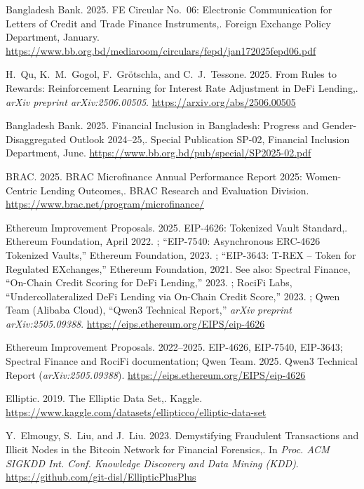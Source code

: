 {\begin{enumerate}[label={[\arabic*]}]
\item Bangladesh Bank. 2025. FE Circular No.~06: Electronic Communication for Letters of Credit and Trade Finance Instruments,. Foreign Exchange Policy Department, January. \url{https://www.bb.org.bd/mediaroom/circulars/fepd/jan172025fepd06.pdf}

\item H.~Qu, K.~M.~Gogol, F.~Gr\"{o}tschla, and C.~J.~Tessone. 2025. From Rules to Rewards: Reinforcement Learning for Interest Rate Adjustment in DeFi Lending,. \emph{arXiv preprint arXiv:2506.00505}. \url{https://arxiv.org/abs/2506.00505}

\item Bangladesh Bank. 2025. Financial Inclusion in Bangladesh: Progress and Gender-Disaggregated Outlook 2024--25,. Special Publication SP-02, Financial Inclusion Department, June. \url{https://www.bb.org.bd/pub/special/SP2025-02.pdf}

\item BRAC. 2025. BRAC Microfinance Annual Performance Report 2025: Women-Centric Lending Outcomes,. BRAC Research and Evaluation Division. \url{https://www.brac.net/program/microfinance/}

\item Ethereum Improvement Proposals. 2025. EIP-4626: Tokenized Vault Standard,. Ethereum Foundation, April 2022. ; ``EIP-7540: Asynchronous ERC-4626 Tokenized Vaults,'' Ethereum Foundation, 2023. ; ``EIP-3643: T-REX -- Token for Regulated EXchanges,'' Ethereum Foundation, 2021.  See also: Spectral Finance, ``On-Chain Credit Scoring for DeFi Lending,'' 2023. ; RociFi Labs, ``Undercollateralized DeFi Lending via On-Chain Credit Score,'' 2023. ; Qwen Team (Alibaba Cloud), ``Qwen3 Technical Report,'' \emph{arXiv preprint arXiv:2505.09388}. \url{https://eips.ethereum.org/EIPS/eip-4626}

\item Ethereum Improvement Proposals. 2022--2025. EIP-4626, EIP-7540, EIP-3643; Spectral Finance and RociFi documentation; Qwen Team. 2025. Qwen3 Technical Report (\emph{arXiv:2505.09388}). \url{https://eips.ethereum.org/EIPS/eip-4626}

\item Elliptic. 2019. The Elliptic Data Set,. Kaggle. \url{https://www.kaggle.com/datasets/ellipticco/elliptic-data-set}

\item Y.~Elmougy, S.~Liu, and J.~Liu. 2023. Demystifying Fraudulent Transactions and Illicit Nodes in the Bitcoin Network for Financial Forensics,. In \emph{Proc. ACM SIGKDD Int. Conf. Knowledge Discovery and Data Mining (KDD)}. \url{https://github.com/git-disl/EllipticPlusPlus}


\end{enumerate}}
